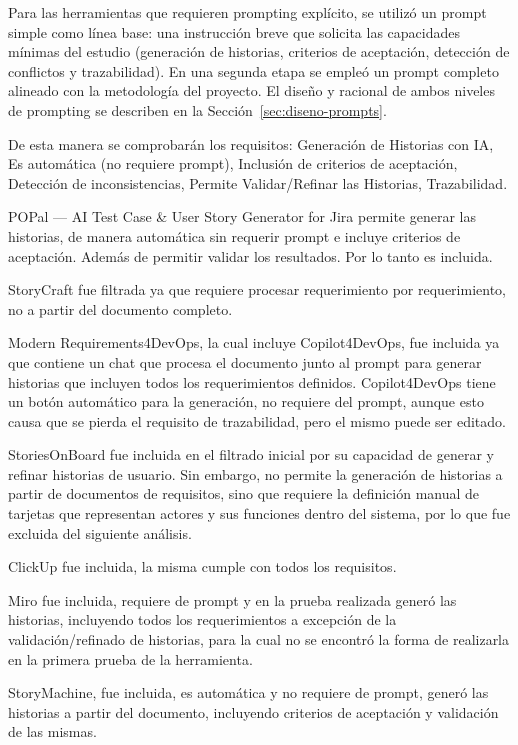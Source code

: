 Para las herramientas que requieren prompting explícito, se utilizó un prompt simple como línea base: una instrucción breve que solicita las capacidades mínimas del estudio (generación de historias, criterios de aceptación, detección de conflictos y trazabilidad). En una segunda etapa se empleó un prompt completo alineado con la metodología del proyecto. El diseño y racional de ambos niveles de prompting se describen en la Sección~\ref{sec:diseno-prompts}.


De esta manera se comprobarán los requisitos: Generación de Historias con IA, Es automática (no requiere prompt), Inclusión de criterios de aceptación, Detección de inconsistencias, Permite Validar/Refinar las Historias, Trazabilidad.

POPal --- AI Test Case \& User Story Generator for Jira permite generar las historias, de manera automática sin requerir prompt e incluye criterios de aceptación. Además de permitir validar los resultados. Por lo tanto es incluida.

StoryCraft fue filtrada ya que requiere procesar requerimiento por requerimiento, no a partir del documento completo.

Modern Requirements4DevOps, la cual incluye Copilot4DevOps, fue incluida ya que contiene un chat que procesa el documento junto al prompt para generar historias que incluyen todos los requerimientos definidos. Copilot4DevOps tiene un botón automático para la generación, no requiere del prompt, aunque esto causa que se pierda el requisito de trazabilidad, pero el mismo puede ser editado.

StoriesOnBoard fue incluida en el filtrado inicial por su capacidad de generar
y refinar historias de usuario. Sin embargo, no permite la generación de
historias a partir de documentos de requisitos, sino que requiere la definición
manual de tarjetas que representan actores y sus funciones dentro del sistema, por lo que fue excluida del siguiente análisis.

ClickUp fue incluida, la misma cumple con todos los requisitos.

Miro fue incluida, requiere de prompt y en la prueba realizada generó las historias, incluyendo todos los requerimientos a excepción de la validación/refinado de historias, para la cual no se encontró la forma de realizarla en la primera prueba de la herramienta.

StoryMachine, fue incluida, es automática y no requiere de prompt, generó las historias a partir del documento, incluyendo criterios de aceptación y validación de las mismas.

